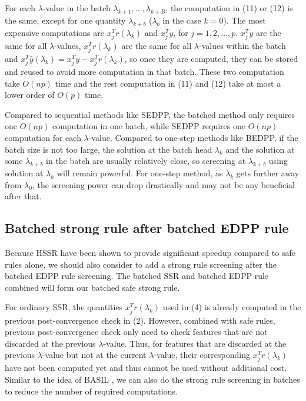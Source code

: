 \documentclass{article}
\begin{document}
For each $\lambda$-value in the batch $\lambda_{k+1},...,\lambda_{k+B}$, the computation in (11) or (12) is the same, except for one quantity $\lambda_{k+b}$ ($\lambda_b$ in the case $k=0$). The most expensive computations are $x_j^Tr(\lambda_k)$ and $x_j^Ty$, for $j=1,2,...,p$. $x_j^Ty$ are the same for all $\lambda$-values, $x_j^Tr(\lambda_k)$ are the same for all $\lambda$-values within the batch and $x_j^T\hat{y}(\lambda_k)=x_j^Ty-x_j^Tr(\lambda_k)$, so once they are computed, they can be stored and reused to avoid more computation in that batch. These two computation take $O(np)$ time and the rest computation in (11) and (12) take at most a lower order of $O(p)$ time.

Compared to sequential methods like SEDPP, the batched method only requires one $O(np)$ computation in one batch, while SEDPP requires one $O(np)$ computation for each $\lambda$-value. Compared to one-step methods like BEDPP, if the batch size is not too large, the solution at the batch head $\lambda_k$ and the solution at some $\lambda_{k+b}$ in the batch are usually relatively close, so screening at $\lambda_{k+b}$ using solution at $\lambda_k$ will remain powerful. For one-step method, as $\lambda_k$ gets further away from $\lambda_0$, the screening power can drop drastically and
may not be any beneficial after that.

\subsection{Batched strong rule after batched EDPP rule}

Because HSSR \cite{zeng2017efficient} have been shown to provide significant speedup compared to safe rules alone, we should also consider to add a strong rule screening after the batched EDPP rule screening. The batched SSR and batched EDPP rule combined will form our batched safe strong rule.

For ordinary SSR, the quantities $x_j^Tr(\lambda_k)$ used in (4) is already computed in the previous post-convergence check in (2). However, combined with safe rules, previous post-convergence check only need to check features that are not discarded at the previous $\lambda$-value. Thus, for features that are discarded at the previous $\lambda$-value but not at the current $\lambda$-value, their corresponding $x_j^Tr(\lambda_k)$ have not been computed yet and thus cannot be used without additional cost. Similar to the idea of BASIL \cite{qian2019fast}, we can also do the strong rule screening in batches to reduce the number of required computations.
\end{document}

